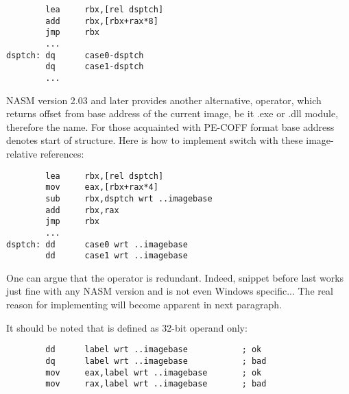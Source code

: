 \begin{lstlisting}
        lea     rbx,[rel dsptch]
        add     rbx,[rbx+rax*8]
        jmp     rbx
        ...
dsptch: dq      case0-dsptch
        dq      case1-dsptch
        ...
\end{lstlisting}

NASM version 2.03 and later provides another alternative,  operator, which returns offset from base address of the
current image, be it .exe or .dll module, therefore the name. For those
acquainted with PE-COFF format base address denotes start of
 structure. Here is how to implement switch with
these image-relative references:

\begin{lstlisting}
        lea     rbx,[rel dsptch]
        mov     eax,[rbx+rax*4]
        sub     rbx,dsptch wrt ..imagebase
        add     rbx,rax
        jmp     rbx
        ...
dsptch: dd      case0 wrt ..imagebase
        dd      case1 wrt ..imagebase
\end{lstlisting}

One can argue that the operator is redundant. Indeed, snippet before
last works just fine with any NASM version and is not even Windows
specific... The real reason for implementing  will
become apparent in next paragraph.

It should be noted that  is defined as 32-bit
operand only:

\begin{lstlisting}
        dd      label wrt ..imagebase           ; ok
        dq      label wrt ..imagebase           ; bad
        mov     eax,label wrt ..imagebase       ; ok
        mov     rax,label wrt ..imagebase       ; bad
\end{lstlisting}

